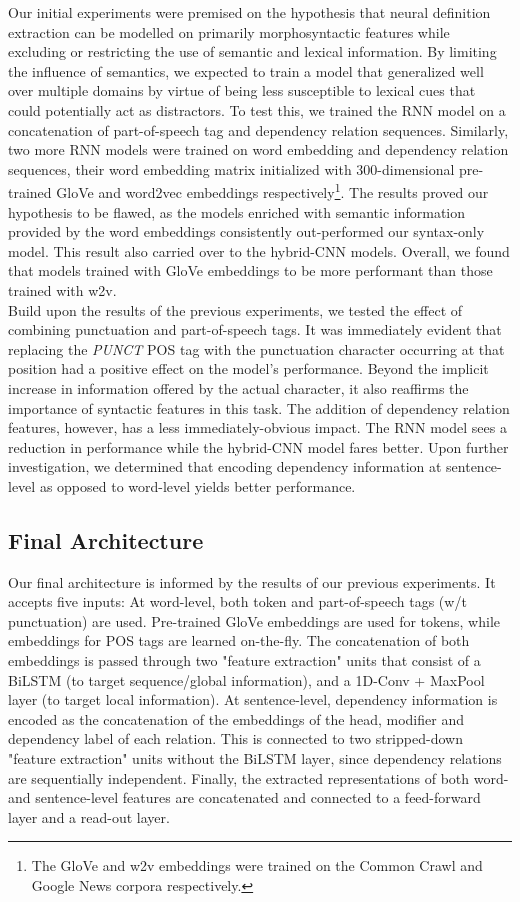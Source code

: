 \documentclass[11pt]{article}
\begin{document}
Our initial experiments were premised on the hypothesis that neural definition extraction can be modelled on primarily
morphosyntactic features while excluding or restricting the use of semantic and lexical information. By limiting the influence
of semantics, we expected to train a model that generalized well over multiple domains by virtue of being less susceptible to
lexical cues that could potentially act as distractors. To test this, we trained the RNN model on a concatenation of
part-of-speech tag and dependency relation sequences. Similarly, two more RNN models were trained on word embedding and dependency
relation sequences, their word embedding matrix initialized with 300-dimensional pre-trained GloVe \cite{pennington2014glove} and
word2vec \cite{mikolov2013efficient} embeddings respectively\footnote{The GloVe and w2v embeddings were trained on the Common Crawl
and Google News corpora respectively.}. The results proved our hypothesis to be flawed, as the models enriched with semantic
information provided by the word embeddings consistently out-performed our syntax-only model. This result also carried over to the
hybrid-CNN models. Overall, we found that models trained with GloVe embeddings to be more performant than those trained with w2v.\\

Build upon the results of the previous experiments, we tested the effect of combining punctuation and part-of-speech tags. It
was immediately evident that replacing the \emph{PUNCT} POS tag with the punctuation character occurring at that position had a
positive effect on the model's performance. Beyond the implicit increase in information offered by the actual character, it
also reaffirms the importance of syntactic features in this task. The addition of dependency relation features, however, has a less
immediately-obvious impact. The RNN model sees a reduction in performance while the hybrid-CNN model fares better. Upon further
investigation, we determined that encoding dependency information at sentence-level as opposed to word-level yields better
performance.


\subsection{Final Architecture}
Our final architecture is informed by the results of our previous experiments. It accepts five inputs: At word-level, both token
and part-of-speech tags (w/t punctuation) are used. Pre-trained GloVe embeddings are used for tokens, while embeddings for POS tags
are learned on-the-fly. The concatenation of both embeddings is passed through two "feature extraction" units that consist of a
BiLSTM (to target sequence/global information), and a 1D-Conv + MaxPool layer (to target local information). At sentence-level,
dependency information is encoded as the concatenation of the embeddings of the head, modifier and dependency label of each relation.
This is connected to two stripped-down "feature extraction" units without the BiLSTM layer, since dependency relations are
sequentially independent. Finally, the extracted representations of both word- and sentence-level features are concatenated and
connected to a feed-forward layer and a read-out layer.\\
\end{document}
